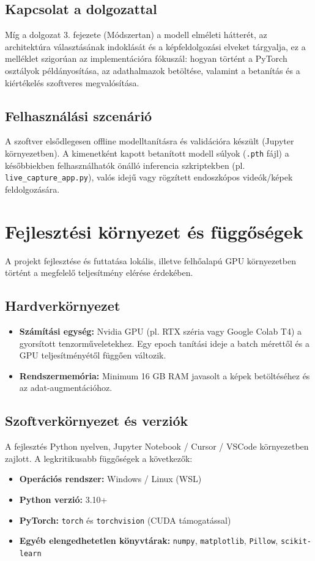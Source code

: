 \documentclass[12pt, a4paper]{report}
\begin{document}
\subsection{Kapcsolat a dolgozattal}
Míg a dolgozat 3. fejezete (Módszertan) a modell elméleti hátterét, az architektúra választásának indoklását és a képfeldolgozási elveket tárgyalja, ez a melléklet szigorúan az implementációra fókuszál: hogyan történt a PyTorch osztályok példányosítása, az adathalmazok betöltése, valamint a betanítás és a kiértékelés szoftveres megvalósítása.

\subsection{Felhasználási szcenárió}
A szoftver elsődlegesen offline modelltanításra és validációra készült (Jupyter környezetben). A kimenetként kapott betanított modell súlyok (\texttt{.pth} fájl) a későbbiekben felhasználhatók önálló inferencia szkriptekben (pl. \texttt{live\_capture\_app.py}), valós idejű vagy rögzített endoszkópos videók/képek feldolgozására.

\section{Fejlesztési környezet és függőségek}

A projekt fejlesztése és futtatása lokális, illetve felhőalapú GPU környezetben történt a megfelelő teljesítmény elérése érdekében.

\subsection{Hardverkörnyezet}
\begin{itemize}
    \item \textbf{Számítási egység:} Nvidia GPU (pl. RTX széria vagy Google Colab T4) a gyorsított tenzorműveletekhez. Egy epoch tanítási ideje a batch mérettől és a GPU teljesítményétől függően változik.
    \item \textbf{Rendszermemória:} Minimum 16 GB RAM javasolt a képek betöltéséhez és az adat-augmentációhoz.
\end{itemize}

\subsection{Szoftverkörnyezet és verziók}
A fejlesztés Python nyelven, Jupyter Notebook / Cursor / VSCode környezetben zajlott. A legkritikusabb függőségek a következők:
\begin{itemize}
    \item \textbf{Operációs rendszer:} Windows / Linux (WSL)
    \item \textbf{Python verzió:} 3.10+
    \item \textbf{PyTorch:} \texttt{torch} és \texttt{torchvision} (CUDA támogatással)
    \item \textbf{Egyéb elengedhetetlen könyvtárak:} \texttt{numpy}, \texttt{matplotlib}, \texttt{Pillow}, \texttt{scikit-learn}
\end{itemize}
\end{document}
